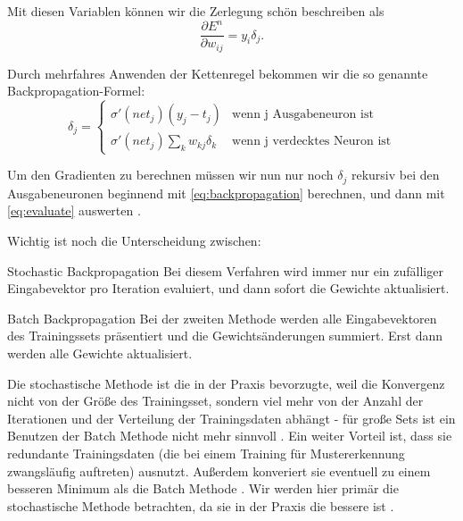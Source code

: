 Mit diesen Variablen können wir die Zerlegung schön beschreiben als
\begin{equation}
\label{eq:evaluate}
  \frac{\partial E^n}{\partial w_{ij}} = y_i \delta_j.
\end{equation}

Durch mehrfahres Anwenden der Kettenregel bekommen wir die so genannte Backpropagation-Formel:
\begin{equation}
\label{eq:backpropagation}
\delta_j =  \begin{cases}
               \sigma ' (net_j) (y_j - t_j)          & \text{wenn j Ausgabeneuron ist}\\
               \sigma ' (net_j) \sum_k w_{kj} \delta_k     & \text{wenn j verdecktes Neuron ist}
           \end{cases} 
\end{equation} 

Um den Gradienten zu berechnen müssen wir nun nur noch $\delta_j$ rekursiv bei den Ausgabeneuronen beginnend mit \ref{eq:backpropagation} berechnen, und dann mit \ref{eq:evaluate} auswerten \cite{bishop1995neural}. 

Wichtig ist noch die Unterscheidung zwischen:

\begin{LaTeXdescription}
	\item[Stochastic Backpropagation]
	Bei diesem Verfahren wird immer nur ein zufälliger Eingabevektor pro Iteration evaluiert, und dann sofort die Gewichte aktualisiert. 
	\item[Batch Backpropagation] 
	Bei der zweiten Methode werden alle Eingabevektoren des Trainingssets präsentiert und die Gewichtsänderungen summiert. Erst dann werden alle Gewichte aktualisiert.\cite{duda2012pattern}
\end{LaTeXdescription}

Die stochastische Methode ist die in der Praxis bevorzugte, weil die Konvergenz nicht von der Größe des Trainingsset, sondern viel mehr von der Anzahl der Iterationen und der Verteilung der Trainingsdaten abhängt - für große Sets ist ein Benutzen der Batch Methode nicht mehr sinnvoll \cite{bengio2012practical}.
Ein weiter Vorteil ist, dass sie redundante Trainingsdaten (die bei einem Training für Mustererkennung zwangsläufig auftreten) ausnutzt. Außerdem konveriert sie eventuell zu einem besseren Minimum als die Batch Methode \cite{lecunefficient}.
Wir werden hier primär die stochastische Methode betrachten, da sie in der Praxis die bessere ist \cite{lecunefficient, bengio2012practical}.


